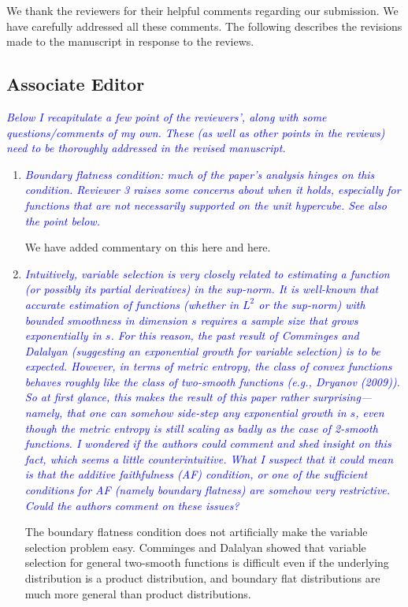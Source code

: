 \documentclass[pdftex,12pt]{article}
\def\rc#1{{\it\textcolor{blue}{#1}}\smallskip}
\begin{document}
\vspace*{5pt}

We thank the reviewers for their helpful comments regarding our
submission. We have carefully addressed all these comments. The
following describes the revisions made to the manuscript in response
to the reviews.

\subsection*{Associate Editor}

\rc{Below I recapitulate a few
point of the reviewers', along with some questions/comments of my own.
These (as well as other points in the reviews) need to be thoroughly
addressed in the revised manuscript.}

\begin{enumerate}
\item \rc{Boundary flatness condition: much of the paper's analysis hinges on
this condition.  Reviewer 3 raises some concerns about when it holds,
especially for functions that are not necessarily supported on the
unit hypercube.  See also the point below.}

We have added commentary on this here and here.

\item \rc{Intuitively, variable selection is very closely related to
estimating a function (or possibly its partial derivatives) in the
sup-norm.  It is well-known that accurate estimation of functions
(whether in $L^2$ or the sup-norm) with bounded smoothness in dimension
$s$ requires a sample size that grows exponentially in $s$.  For this
reason, the past result of Comminges and Dalalyan (suggesting an
exponential growth for variable selection) is to be expected.
However, in terms of metric entropy, the class of convex functions
behaves roughly like the class of two-smooth functions (e.g., Dryanov
(2009)).  So at first glance, this makes the result of this paper
rather surprising---namely, that one can somehow side-step any
exponential growth in $s$, even though the metric entropy is still
scaling as badly as the case of 2-smooth functions.  I wondered if the
authors could comment and shed insight on this fact, which seems a
little counterintuitive.  What I suspect that it could mean is that
the additive faithfulness (AF) condition, or one of the sufficient
conditions for AF (namely boundary flatness) are somehow very
restrictive.  Could the authors comment on these issues?}

The boundary flatness condition does not artificially make the variable selection problem easy. Comminges and Dalalyan showed that variable selection for general two-smooth functions is difficult even if the underlying distribution is a product distribution, and boundary flat distributions are much more general than product distributions. 


\end{enumerate}
\end{document}

